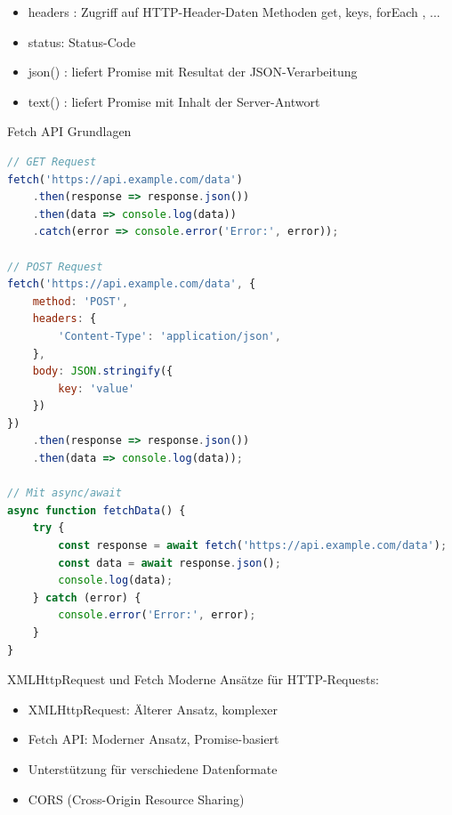 \begin{itemize}
\item headers : Zugriff auf HTTP-Header-Daten Methoden get, keys, forEach , ...
\item status: Status-Code
\item json() : liefert Promise mit Resultat der JSON-Verarbeitung
\item text() : liefert Promise mit Inhalt der Server-Antwort
\end{itemize}

\begin{KR}{Fetch API Grundlagen}
\begin{lstlisting}[language=JavaScript, style=basesmol]
// GET Request
fetch('https://api.example.com/data')
    .then(response => response.json())
    .then(data => console.log(data))
    .catch(error => console.error('Error:', error));

// POST Request
fetch('https://api.example.com/data', {
    method: 'POST',
    headers: {
        'Content-Type': 'application/json',
    },
    body: JSON.stringify({
        key: 'value'
    })
})
    .then(response => response.json())
    .then(data => console.log(data));

// Mit async/await
async function fetchData() {
    try {
        const response = await fetch('https://api.example.com/data');
        const data = await response.json();
        console.log(data);
    } catch (error) {
        console.error('Error:', error);
    }
}
\end{lstlisting}
\end{KR}

\begin{concept}{XMLHttpRequest und Fetch}
    Moderne Ansätze für HTTP-Requests:
    \begin{itemize}
        \item XMLHttpRequest: Älterer Ansatz, komplexer
        \item Fetch API: Moderner Ansatz, Promise-basiert
        \item Unterstützung für verschiedene Datenformate
        \item CORS (Cross-Origin Resource Sharing)
    \end{itemize}
\end{concept}

